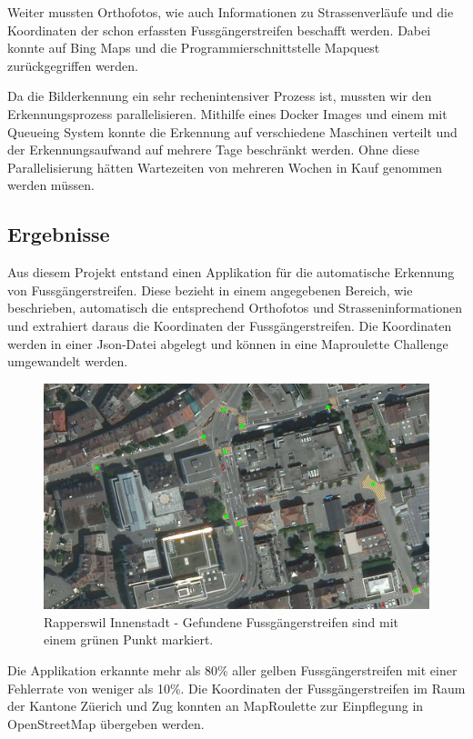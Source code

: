 Weiter mussten Orthofotos, wie auch Informationen zu Strassenverläufe und die Koordinaten der schon erfassten Fussgängerstreifen beschafft werden. Dabei konnte auf Bing Maps und die Programmierschnittstelle Mapquest zurückgegriffen werden.

Da die Bilderkennung ein sehr rechenintensiver Prozess ist, mussten wir den Erkennungsprozess parallelisieren. Mithilfe eines Docker Images und einem mit Queueing System konnte die Erkennung auf verschiedene Maschinen verteilt und der Erkennungsaufwand auf mehrere Tage beschränkt werden. Ohne diese Parallelisierung hätten Wartezeiten von mehreren Wochen in Kauf genommen werden müssen.


\subsection*{Ergebnisse}
Aus diesem Projekt entstand einen Applikation für die automatische Erkennung von Fussgängerstreifen. Diese bezieht in einem angegebenen Bereich, wie beschrieben, automatisch die entsprechend Orthofotos und Strasseninformationen und extrahiert daraus die Koordinaten der Fussgängerstreifen. Die Koordinaten werden in einer Json-Datei abgelegt und können in eine Maproulette Challenge umgewandelt werden. 
\\
\begin{figure}[H]
	\centering
	\includegraphics[width=\textwidth -10mm]{images/boxsave_rappi.png}
	\caption[Überblick]{Rapperswil Innenstadt - Gefundene Fussgängerstreifen sind mit einem grünen Punkt markiert.}
\end{figure}
Die Applikation erkannte mehr als 80\% aller gelben Fussgängerstreifen mit einer Fehlerrate von weniger als 10\%. Die Koordinaten der Fussgängerstreifen im Raum der Kantone Züerich und Zug konnten an MapRoulette zur Einpflegung in OpenStreetMap übergeben werden.
